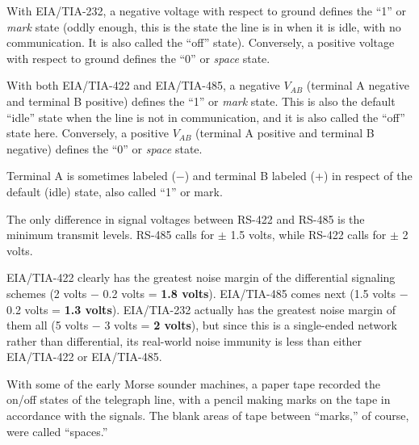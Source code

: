 





With EIA/TIA-232, a negative voltage with respect to ground defines the ``1'' or {\it mark} state (oddly enough, this is the state the line is in when it is idle, with no communication.  It is also called the ``off'' state).  Conversely, a positive voltage with respect to ground defines the ``0'' or {\it space} state.

\vskip 10pt

With both EIA/TIA-422 and EIA/TIA-485, a negative $V_{AB}$ (terminal A negative and terminal B positive) defines the ``1'' or {\it mark} state.  This is also the default ``idle'' state when the line is not in communication, and it is also called the ``off'' state here.  Conversely, a positive $V_{AB}$ (terminal A positive and terminal B negative) defines the ``0'' or {\it space} state.  

Terminal A is sometimes labeled ($-$) and terminal B labeled (+) in respect of the default (idle) state, also called ``1'' or mark.

\vskip 10pt

The only difference in signal voltages between RS-422 and RS-485 is the minimum transmit levels.  RS-485 calls for $\pm$ 1.5 volts, while RS-422 calls for $\pm$ 2 volts.

\vskip 10pt

EIA/TIA-422 clearly has the greatest noise margin of the differential signaling schemes (2 volts $-$ 0.2 volts = {\bf 1.8 volts}).  EIA/TIA-485 comes next (1.5 volts $-$ 0.2 volts = {\bf 1.3 volts}).  EIA/TIA-232 actually has the greatest noise margin of them all (5 volts $-$ 3 volts = {\bf 2 volts}), but since this is a single-ended network rather than differential, its real-world noise immunity is less than either EIA/TIA-422 or EIA/TIA-485.

\vskip 10pt

With some of the early Morse sounder machines, a paper tape recorded the on/off states of the telegraph line, with a pencil making marks on the tape in accordance with the signals.  The blank areas of tape between ``marks,'' of course, were called ``spaces.''




